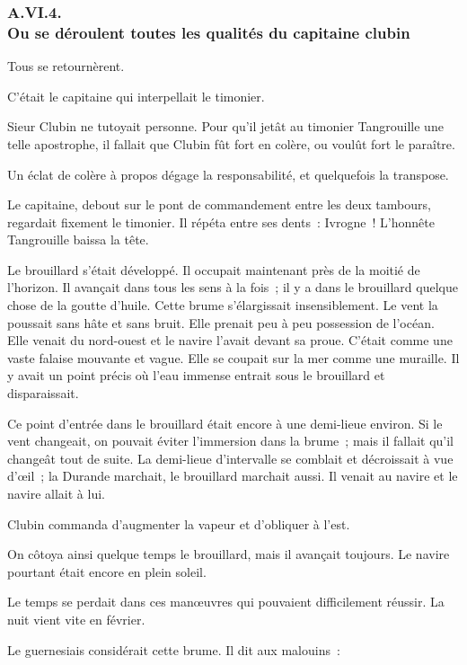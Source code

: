 \documentclass[french,twoside]{book} %
\begin{document}
 \subsubsection[{A.VI.4. Ou se déroulent toutes les qualités du capitaine clubin}]{A.VI.4. \\
Ou se déroulent toutes les qualités du capitaine clubin}
\noindent Tous se retournèrent.\par
C’était le capitaine qui interpellait le timonier.\par
Sieur Clubin ne tutoyait personne. Pour qu’il jetât au timonier Tangrouille une telle apostrophe, il fallait que Clubin fût fort en colère, ou voulût fort le paraître.\par
Un éclat de colère à propos dégage la responsabilité, et quelquefois la transpose.\par
Le capitaine, debout sur le pont de commandement entre les deux tambours, regardait fixement le timonier. Il répéta entre ses dents : Ivrogne ! L’honnête Tangrouille baissa la tête.\par
Le brouillard s’était développé. Il occupait maintenant près de la moitié de l’horizon. Il avançait dans tous les sens à la fois ; il y a dans le brouillard quelque chose de la goutte d’huile. Cette brume s’élargissait insensiblement. Le vent la poussait sans hâte et sans bruit. Elle prenait peu à peu possession de l’océan. Elle  venait du nord-ouest et le navire l’avait devant sa proue. C’était comme une vaste falaise mouvante et vague. Elle se coupait sur la mer comme une muraille. Il y avait un point précis où l’eau immense entrait sous le brouillard et disparaissait.\par
Ce point d’entrée dans le brouillard était encore à une demi-lieue environ. Si le vent changeait, on pouvait éviter l’immersion dans la brume ; mais il fallait qu’il changeât tout de suite. La demi-lieue d’intervalle se comblait et décroissait à vue d’œil ; la Durande marchait, le brouillard marchait aussi. Il venait au navire et le navire allait à lui.\par
Clubin commanda d’augmenter la vapeur et d’obliquer à l’est.\par
On côtoya ainsi quelque temps le brouillard, mais il avançait toujours. Le navire pourtant était encore en plein soleil.\par
Le temps se perdait dans ces manœuvres qui pouvaient difficilement réussir. La nuit vient vite en février.\par
Le guernesiais considérait cette brume. Il dit aux malouins :\par
\end{document}
